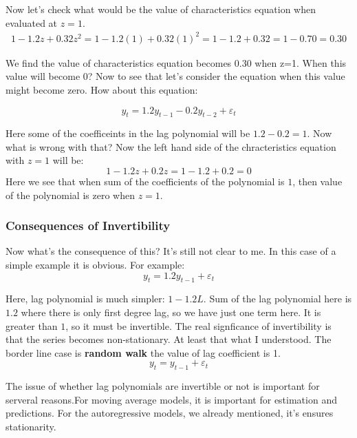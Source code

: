 \documentclass{book}
\begin{document}
Now let's check what would be the value of characteristics equation when evaluated at $z=1$. 
\begin{gather}
    1-1.2z+0.32z^2=1-1.2(1)+0.32(1)^2=1-1.2+0.32=1-0.70=0.30
\end{gather}

We find the value of characteristics equation becomes $0.30$ when z=1. When this value will become $0$? Now to see that let's consider the equation when this value might become zero. How about this equation:

\begin{equation}\label{eqexmv2}
    y_t=1.2y_{t-1}-0.2y_{t-2}+\varepsilon_t
\end{equation}

Here some of the coefficeints in the lag polynomial will be $1.2-0.2=1$. Now what is wrong with that? Now the left hand side of the chracteristics equation with $z=1$ will be:
\[1-1.2z+0.2z=1-1.2+0.2=0\]
Here we see that when sum of the coefficients of the polynomial is $1$, then value of the polynomial is zero when $z=1$. 

\subsubsection{Consequences of Invertibility}
Now what's the consequence of this? It's still not clear to me. In this case of a simple example it is obvious. For example:
\begin{equation}\label{eqrw}
    y_t=1.2y_{t-1} +\varepsilon_t
\end{equation}

Here, lag polynomial is much simpler: $1-1.2L$. Sum of the lag polynomial here is $1.2$ where there is only first degree lag, so we have just one term here. It is greater than $1$, so it must be invertible. The real signficance of invertibility is that the series becomes non-stationary. At least that what I understood. The border line case is \textbf{random walk} the value of lag coefficient is 1.
\[y_t=y_{t-1}+\varepsilon_t\]

The issue of whether lag polynomials are invertible or not is important for serveral reasons.For moving average models, it is important for estimation and predictions. For the autoregressive models, we already mentioned, it's ensures stationarity. 
\end{document}
